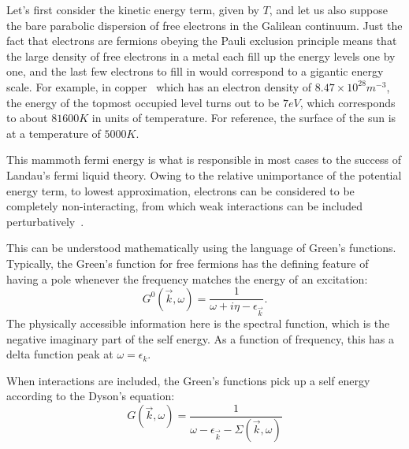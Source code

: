 \par
Let's first consider the kinetic energy term, given by $T$, and let us also suppose the bare parabolic dispersion of free electrons in the Galilean continuum.
Just the fact that electrons are fermions obeying the Pauli exclusion principle means that the large density of free electrons in a metal each fill up the energy levels one by one, and the last few electrons to fill in would correspond to a gigantic energy scale. For example, in copper~\cite{Ashcroft1976} which has an electron density of $8.47\times 10^{28} m^{-3}$, the energy of the topmost occupied level turns out to be $7 eV$, which corresponds to about $81600 K$ in units of temperature. For reference, the surface of the sun is at a temperature of $5000 K$. 
\par 
This mammoth fermi energy is what is responsible in most cases to the success of Landau's fermi liquid theory. Owing to the relative unimportance of the potential energy term, to lowest approximation, electrons can be considered to be completely non-interacting, from which weak interactions can be included perturbatively~\cite{luttinger1960ground,baym1961conservation,pines2018microscopic}. 
\par 
This can be understood mathematically using the language of Green's functions. Typically, the Green's function for free fermions has the defining feature of having a pole whenever the frequency matches the energy of an excitation:
\begin{equation}
        G^0(\vec{k},\omega) = \frac{1}{\omega + i\eta - \epsilon_{\vec{k}}} .
\end{equation}
The physically accessible information here is the spectral function, which is the negative imaginary part of the self energy. As a function of frequency, this has a delta function peak at $\omega = \epsilon_k$. 
\par
When interactions are included, the Green's functions pick up a self energy according to the Dyson's equation:
\begin{equation}
    G(\vec{k},\omega) = \frac{1}{\omega - \epsilon_{\vec{k}} - \Sigma(\vec{k},\omega)}
\end{equation}

